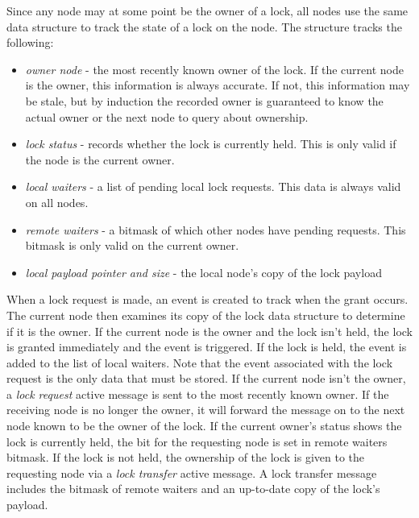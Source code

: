 Since any node may at some point be the owner of a lock, all nodes use the same data structure to track the
state of a lock on the node.
The structure tracks the following:
\begin{itemize} \itemsep1pt \parskip0pt 
\item {\em owner node} - the most recently known owner of the lock.  If the current node is the owner, this
information is always accurate.  If not, this information may be stale, but by induction the recorded 
owner is guaranteed to know the actual owner or the next node to query about ownership.
\item {\em lock status} - records whether the lock is currently held.  This is only valid if the node
is the current owner.
\item {\em local waiters} - a list of pending local lock requests.  This data is always valid on all nodes.
\item {\em remote waiters} - a bitmask of which other nodes have pending requests.  This bitmask is only
valid on the current owner.
\item {\em local payload pointer and size} - the local node's copy of the lock payload
\end{itemize}

When a lock request is made, an event is created to track when the grant occurs.  The current node then
examines its copy of the lock data structure to determine if it is the owner.
If the current node is the owner and the lock isn't
held, the lock is granted immediately and the event is triggered.  If the lock is held, the event is added
to the list of local waiters.  Note that the event associated with
the lock request is the only data that must be stored.
If the current node isn't the owner, a {\em lock request} active message is
sent to the most recently known owner.  If the receiving node is no
longer the owner, it will forward the message on to the next node known
to be the owner of the lock.
If the current owner's status shows
the lock is currently held, the bit for the requesting node is set in remote waiters bitmask.  If the lock is
not held, the ownership of the lock is given to the requesting node via a {\em lock transfer} active
message.  A lock transfer message includes the bitmask of remote waiters and an up-to-date copy 
of the lock's payload.

